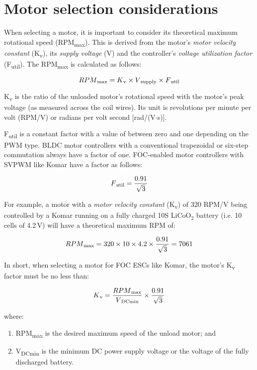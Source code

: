 \chapter{Motor selection considerations}
When selecting a motor, it is important to consider its theoretical maximum rotational speed
(RPM\textsubscript{max}). This is derived from the motor's \emph{motor velocity constant}
(K\textsubscript{v}), its \emph{supply voltage} (V) and the controller's \emph{voltage utilization
factor} (F\textsubscript{util}). The RPM\textsubscript{max} is calculated as follows:

\[RPM\textsubscript{max} = K\textsubscript{v} \times V\textsubscript{supply} \times F\textsubscript{util}\]

K\textsubscript{v} is the ratio of the unloaded motor's rotational speed with the motor's peak
voltage (as measured across the coil wires). Its unit is revolutions per minute per volt (RPM/V)
or radians per volt second [rad/(V$\cdot$s)].

F\textsubscript{util} is a constant factor with a value of between zero and one depending on the
PWM type. BLDC motor controllers with a conventional trapezoidal or six-step commutation always
have a factor of one. FOC-enabled motor controllers with SVPWM like Komar have a factor as follows:

\[F\textsubscript{util} = \frac{0.91}{\sqrt{3}}\]

For example, a motor with a \emph{motor velocity constant} (K\textsubscript{v}) of 320 RPM/V being
controlled by a Komar running on a fully charged 10S $\text{LiCoO}_\text{2}$ battery (i.e. 10 cells
of 4.2\,V) will have a theoretical maximum RPM of:

\[RPM\textsubscript{max} = 320 \times 10 \times 4.2 \times \frac{0.91}{\sqrt{3}} = 7061\]

In short, when selecting a motor for FOC ESCs like Komar, the motor's K\textsubscript{v} factor
must be no less than:

\[K\textsubscript{v} = \frac{RPM\textsubscript{max}}{V\textsubscript{DCmin}} \times \frac{0.91}{\sqrt{3}}\]

where:

\begin{enumerate}[label=(\roman*),leftmargin=\leftskip+1em,labelindent=!]
  \item RPM\textsubscript{max} is the desired maximum speed of the unload motor; and
  \item V\textsubscript{DCmin} is the minimum DC power supply voltage or the voltage of the
        fully discharged battery.
\end{enumerate}
